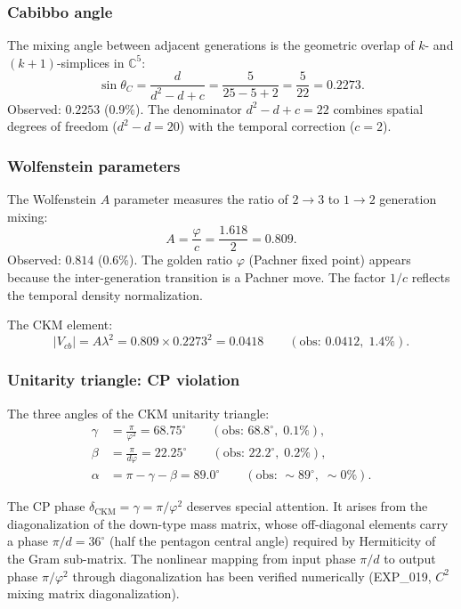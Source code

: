 \documentclass[12pt]{article}
\theoremstyle{remark}
\theoremstyle{definition}
\newcommand{\CC}{\mathbb{C}}
\begin{document}
\subsubsection{Cabibbo angle}

The mixing angle between adjacent generations is the geometric overlap of $k$- and $(k+1)$-simplices in $\CC^5$:
\begin{equation}
\sin\theta_C = \frac{d}{d^2 - d + c} = \frac{5}{25 - 5 + 2} = \frac{5}{22} = 0.2273.
\end{equation}
Observed: $0.2253$ (0.9\%). The denominator $d^2 - d + c = 22$ combines spatial degrees of freedom ($d^2 - d = 20$) with the temporal correction ($c = 2$).

\subsubsection{Wolfenstein parameters}

The Wolfenstein $A$ parameter measures the ratio of $2 \to 3$ to $1 \to 2$ generation mixing:
\begin{equation}
A = \frac{\varphi}{c} = \frac{1.618}{2} = 0.809.
\end{equation}
Observed: $0.814$ (0.6\%). The golden ratio $\varphi$ (Pachner fixed point) appears because the inter-generation transition is a Pachner move. The factor $1/c$ reflects the temporal density normalization.

The CKM element:
\begin{equation}
|V_{cb}| = A\lambda^2 = 0.809 \times 0.2273^2 = 0.0418 \qquad (\text{obs: } 0.0412,\; 1.4\%).
\end{equation}

\subsubsection{Unitarity triangle: CP violation}

The three angles of the CKM unitarity triangle:
\begin{align}
\gamma &= \frac{\pi}{\varphi^2} = 68.75^\circ \qquad (\text{obs: } 68.8^\circ,\; 0.1\%), \label{eq:gamma} \\
\beta &= \frac{\pi}{d\varphi} = 22.25^\circ \qquad (\text{obs: } 22.2^\circ,\; 0.2\%), \\
\alpha &= \pi - \gamma - \beta = 89.0^\circ \qquad (\text{obs: } \sim 89^\circ,\; \sim 0\%).
\end{align}

The CP phase $\delta_\text{CKM} = \gamma = \pi/\varphi^2$ deserves special attention. It arises from the diagonalization of the down-type mass matrix, whose off-diagonal elements carry a phase $\pi/d = 36^\circ$ (half the pentagon central angle) required by Hermiticity of the Gram sub-matrix. The nonlinear mapping from input phase $\pi/d$ to output phase $\pi/\varphi^2$ through diagonalization has been verified numerically (EXP\_019, $C^2$ mixing matrix diagonalization).
\end{document}
